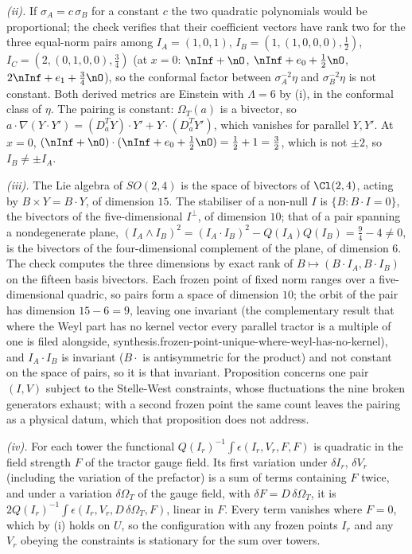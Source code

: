 \emph{(ii).} If $\sigma_{A} = c\,\sigma_{B}$ for a constant $c$ the two quadratic polynomials would be proportional; the check verifies that their coefficient vectors have rank two for the three equal-norm pairs among $I_{A} = (1,0,1)$, $I_{B} = (1,(1,0,0,0),\tfrac12)$, $I_{C} = (2,(0,1,0,0),\tfrac34)$ (at $x = 0$: $\nInf + \nO$, $\nInf + e_{0} + \tfrac12\nO$, $2\nInf + e_{1} + \tfrac34\nO$), so the conformal factor between $\sigma_{A}^{-2}\eta$ and $\sigma_{B}^{-2}\eta$ is not constant. Both derived metrics are Einstein with $\Lambda = 6$ by (i), in the conformal class of $\eta$. The pairing is constant: $\Omega_{T}(a)$ is a bivector, so $a \cdot \nabla(Y \cdot Y') = (D^{T}_{a}Y) \cdot Y' + Y \cdot (D^{T}_{a}Y')$, which vanishes for parallel $Y, Y'$. At $x = 0$, $(\nInf + \nO) \cdot (\nInf + e_{0} + \tfrac12\nO) = \tfrac12 + 1 = \tfrac32$, which is not $\pm 2$, so $I_{B} \neq \pm I_{A}$.

\emph{(iii).} The Lie algebra of $SO(2,4)$ is the space of bivectors of $\Cl(2,4)$, acting by $B \times Y = B \cdot Y$, of dimension $15$. The stabiliser of a non-null $I$ is $\{B : B \cdot I = 0\}$, the bivectors of the five-dimensional $I^{\perp}$, of dimension $10$; that of a pair spanning a nondegenerate plane, $(I_{A} \wedge I_{B})^{2} = (I_{A} \cdot I_{B})^{2} - Q(I_{A})Q(I_{B}) = \tfrac94 - 4 \neq 0$, is the bivectors of the four-dimensional complement of the plane, of dimension $6$. The check computes the three dimensions by exact rank of $B \mapsto (B \cdot I_{A}, B \cdot I_{B})$ on the fifteen basis bivectors. Each frozen point of fixed norm ranges over a five-dimensional quadric, so pairs form a space of dimension $10$; the orbit of the pair has dimension $15 - 6 = 9$, leaving one invariant (the complementary result that where the Weyl part has no kernel vector every parallel tractor is a multiple of one is filed alongside, synthesis.frozen-point-unique-where-weyl-has-no-kernel), and $I_{A} \cdot I_{B}$ is invariant ($B \cdot$ is antisymmetric for the product) and not constant on the space of pairs, so it is that invariant. Proposition  concerns one pair $(I, V)$ subject to the Stelle-West constraints, whose fluctuations the nine broken generators exhaust; with a second frozen point the same count leaves the pairing as a physical datum, which that proposition does not address.

\emph{(iv).} For each tower the functional $Q(I_r)^{-1}\int\epsilon(I_r, V_r, F, F)$ is quadratic in the field strength $F$ of the tractor gauge field. Its first variation under $\delta I_r$, $\delta V_r$ (including the variation of the prefactor) is a sum of terms containing $F$ twice, and under a variation $\delta\Omega_{T}$ of the gauge field, with $\delta F = D\,\delta\Omega_{T}$, it is $2Q(I_r)^{-1}\int \epsilon(I_r, V_r, D\,\delta\Omega_{T}, F)$, linear in $F$. Every term vanishes where $F = 0$, which by (i) holds on $U$, so the configuration with any frozen points $I_r$ and any $V_r$ obeying the constraints is stationary for the sum over towers.

